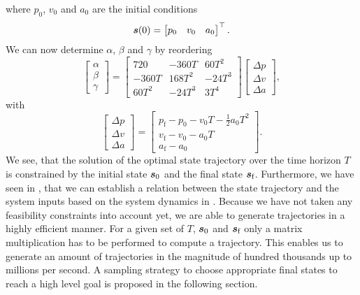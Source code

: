 where $p_0$, $v_0$ and $a_0$ are the initial conditions 
\begin{equation}
	\mbox{$\bm{s}$}(0) = 
	\begin{bmatrix}
		p_0 & v_0 & a_0
	\end{bmatrix}^\top
	.
\end{equation}
We can now determine $\alpha$, $\beta$ and $\gamma$ by reordering 
\begin{equation}
	\label{eq:trajectory-coefficients}
	\begin{bmatrix}
		\alpha \\
		\beta \\
		\gamma
	\end{bmatrix}
	=
	\begin{bmatrix}
		720 & -360T & 60T^2 \\
		-360T & 168T^2 & -24T^3 \\
		60T^2 & -24T^3 & 3T^4

	\end{bmatrix}
	\begin{bmatrix}
		\Delta p \\
		\Delta v \\
		\Delta a
	\end{bmatrix}
	,
\end{equation}
with
\begin{equation}
	\label{eq:trajectory-delta-state}
	\begin{bmatrix}
		\Delta p \\
		\Delta v \\
		\Delta a
	\end{bmatrix}
	= 
	\begin{bmatrix}
		p_\text{f} - p_0 - v_0 T - \frac{1}{2}a_0 T^2 \\
		v_\text{f} - v_0 - a_0 T \\
		a_\text{f} - a_0
	\end{bmatrix}
	.
\end{equation}
We see, that the solution of the optimal state trajectory over the time horizon $T$ is constrained by the initial state $\mbox{$\bm{s}$}_0$ and the final state $\mbox{$\bm{s}$}_\text{f}$. Furthermore, we have seen in , that we can establish a relation between the state trajectory and the system inputs based on the system dynamics in . Because we have not taken any feasibility constraints into account yet, we are able to generate trajectories in a highly efficient manner. For a given set of $T$, $\mbox{$\bm{s}$}_0$ and $\mbox{$\bm{s}$}_\text{f}$ only a matrix multiplication has to be performed to compute a trajectory. This enables us to generate an amount of trajectories in the magnitude of hundred thousands up to millions per second. A sampling strategy to choose appropriate final states to reach a high level goal is proposed in the following section.

